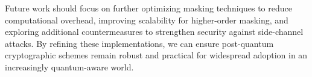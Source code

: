 Future work should focus on further optimizing masking techniques to reduce computational overhead, improving scalability for higher-order masking, and exploring additional countermeasures to strengthen security against side-channel attacks. By refining these implementations, we can ensure post-quantum cryptographic schemes remain robust and practical for widespread adoption in an increasingly quantum-aware world.

